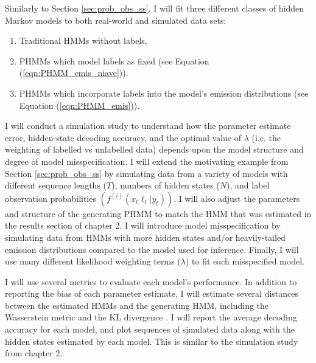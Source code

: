 

Similarly to Section \ref{sec:prob_obs_ss}, I will fit three different classes of hidden Markov models to both real-world and simulated data sets:

\begin{enumerate}
    \item Traditional HMMs without labels,
    \item PHMMs which model labels as fixed (see Equation (\ref{eqn:PHMM_emis_niave})).
    \item PHMMs which incorporate labels into the model's emission distributions (see Equation (\ref{eqn:PHMM_emis})).
\end{enumerate}


I will conduct a simulation study to understand how the parameter estimate error, hidden-state decoding accuracy, and the optimal value of $\lambda$ (i.e. the weighting of labelled vs unlabelled data) depends upon the model structure and degree of model misspecification. I will extend the motivating example from Section \ref{sec:prob_obs_ss} by simulating data from a variety of models with different sequence lengths ($T$), numbers of hidden states ($N$), and label observation probabilities $\left(f^{(i)}(x_t\ell_t|y_t)\right)$. I will also adjust the parameters and structure of the generating PHMM to match the HMM that was estimated in the results section of chapter 2. I will introduce model misspecification by simulating data from HMMs with more hidden states and/or heavily-tailed emission distributions compared to the model used for inference. Finally, I will use many different likelihood weighting terms ($\lambda$) to fit each misspecified model.

I will use several metrics to evaluate each model's performance. In addition to reporting the bias of each parameter estimate, I will estimate several distances between the estimated HMMs and the generating HMM, including the Wasserstein metric \citep{Chen:2020} and the KL divergence \citep{Kullback:1951}. I will report the average decoding accuracy for each model, and plot sequences of simulated data along with the hidden states estimated by each model. This is similar to the simulation study from chapter 2.

